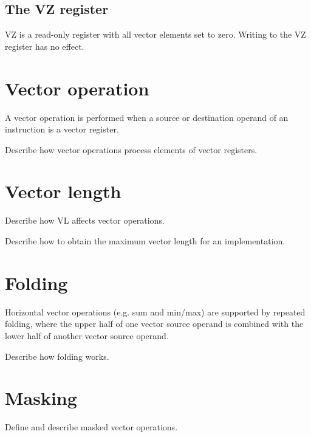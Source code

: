 \subsection{The VZ register}

VZ is a read-only register with all vector elements set to zero. Writing to the
VZ register has no effect.

\section{Vector operation}

A vector operation is performed when a source or destination operand of an
instruction is a vector register.

\begin{todobox}
  Describe how vector operations process elements of vector registers.
\end{todobox}

\section{Vector length}

\begin{todobox}
  Describe how VL affects vector operations.

  Describe how to obtain the maximum vector length for an implementation.
\end{todobox}

\section{Folding}

Horizontal vector operations (e.g. sum and min/max) are supported by repeated
folding, where the upper half of one vector source operand is combined with the
lower half of another vector source operand.

\begin{todobox}
  Describe how folding works.
\end{todobox}

\section{Masking}

\begin{todobox}
  Define and describe masked vector operations.
\end{todobox}

